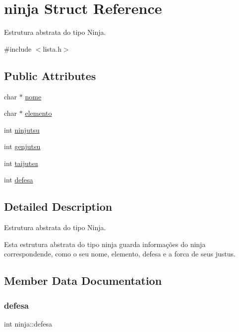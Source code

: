 \hypertarget{structninja}{}\section{ninja Struct Reference}
\label{structninja}


Estrutura abstrata do tipo Ninja.  




{\ttfamily \#include $<$lista.\+h$>$}

\subsection*{Public Attributes}
\begin{DoxyCompactItemize}
\item 
char $\ast$ \mbox{\hyperlink{structninja_a09c81900a27da1cf72d9b6f44b4051f2}{nome}}
\item 
char $\ast$ \mbox{\hyperlink{structninja_a0461035a441b95091803732b1bd4e76c}{elemento}}
\item 
int \mbox{\hyperlink{structninja_a6b840282381ec6145bc4c2ef512b4b74}{ninjutsu}}
\item 
int \mbox{\hyperlink{structninja_adfb9e88d0513d41d9750134763f2cccd}{genjutsu}}
\item 
int \mbox{\hyperlink{structninja_aceb226ee3b2a48bc1bdfc29237adb5e5}{taijutsu}}
\item 
int \mbox{\hyperlink{structninja_aedbaa968946c242cab4da6f5c68a9974}{defesa}}
\end{DoxyCompactItemize}


\subsection{Detailed Description}
Estrutura abstrata do tipo Ninja. 

Esta estrutura abstrata do tipo ninja guarda informações do ninja correspondende, como o seu nome, elemento, defesa e a forca de seus justus. 

\subsection{Member Data Documentation}
\mbox{\label{structninja_aedbaa968946c242cab4da6f5c68a9974}} 
\subsubsection{\texorpdfstring{defesa}{defesa}}
{\footnotesize\ttfamily int ninja\+::defesa}

